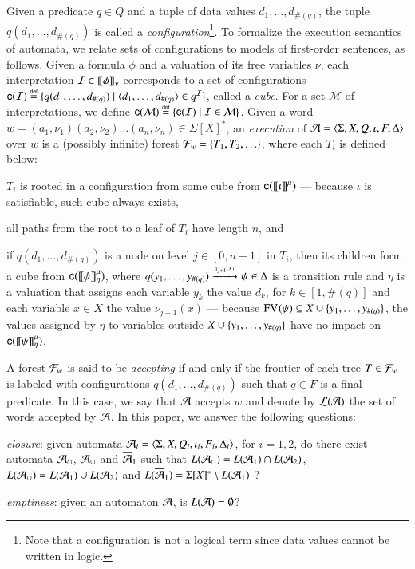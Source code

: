 \documentclass{llncs}
\begin{document}
Given a predicate $q \in Q$ and a tuple of data values
$d_1,\ldots,d_{\#(q)}$, the tuple $q(d_1,\ldots,d_{\#(q)})$ is called
a \emph{configuration}\footnote{Note that a configuration is not a
  logical term since data values cannot be written in logic.}. To
formalize the execution semantics of automata, we relate sets of
configurations to models of first-order sentences, as follows. Given a
formula $\phi$ and a valuation of its free variables $\nu$, each
interpretation $\mathcal{I} \in {\bf [\![} \phi {\bf ]\!]}_\nu$ corresponds to a set of
configurations $\mathsf{c}({\mathcal{I}}) \stackrel{\scriptscriptstyle{\mathsf{def}}}{=} \{ q(d_1,\ldots,d_{\#(q)}) \mid
  \langle d_1,\ldots,d_{\#(q)} \rangle \in q^{\mathcal{I}} \}$, called a \emph{cube}. For a
set $\mathcal{M}$ of interpretations, we define $\mathsf{c}({\mathcal{M}})
\stackrel{\scriptscriptstyle{\mathsf{def}}}{=} \{ \mathsf{c}({\mathcal{I}}) \mid \mathcal{I} \in \mathcal{M} \}$. Given a word
$w=(a_1,\nu_1)(a_2,\nu_2) \ldots (a_n,\nu_n) \in \Sigma[X]^*$, an
\emph{execution} of $\mathcal{A}=\langle \Sigma,X,Q,\iota,F,\Delta \rangle$ over $w$ is
a (possibly infinite) forest $\mathcal{F}_w = \{ T_1,T_2,\ldots \}$, where each
$T_i$ is defined below:
\begin{compactitem}
\item $T_i$ is rooted in a configuration from some cube from
  $\mathsf{c}({{\bf [\![} \iota {\bf ]\!]}^\mu})$ --- because $\iota$ is satisfiable, such cube
  always exists,
%
\item all paths from the root to a leaf of $T_i$ have length $n$, and
%
\item if $q(d_1,\ldots,d_{\#(q)})$ is a node on level $j \in [0,n-1]$
  in $T_i$, then its children form a cube from
  $\mathsf{c}({{\bf [\![} \psi {\bf ]\!]}^\mu_\eta})$, where \(q(y_1,\ldots,y_{\#(q)})
  \xrightarrow{{\scriptscriptstyle a_{j+1}(X)}}_{{\scriptstyle }} \psi \in \Delta\) is a transition rule and
  $\eta$ is a valuation that assigns each variable $y_k$ the value
  $d_k$, for $k \in [1,\#(q)]$ and each variable $x \in X$ the value
  $\nu_{j+1}(x)$ --- because $\mathrm{FV}_{}(\psi) \subseteq X \cup
  \{ y_1,\ldots,y_{\#(q)} \}$, the values assigned by $\eta$ to
  variables outside $X \cup \{ y_1,\ldots,y_{\#(q)} \}$ have no impact
  on $\mathsf{c}({{\bf [\![} \psi {\bf ]\!]}^\mu_\eta})$.
\end{compactitem}
A forest $\mathcal{F}_w$ is said to be \emph{accepting} if and only if the
frontier of each tree $T \in \mathcal{F}_w$ is labeled with configurations
$q(d_1,\ldots,d_{\#(q)})$ such that $q \in F$ is a final predicate. In
this case, we say that $\mathcal{A}$ accepts $w$ and denote by ${\mathcal L}({\mathcal{A}})$ the
set of words accepted by $\mathcal{A}$. In this paper, we answer the following
questions: \begin{compactenum}
\item \emph{closure}: given automata $\mathcal{A}_i =
  \langle \Sigma,X,Q_i,\iota_i,F_i,\Delta_i \rangle$, for $i=1,2$, do there
  exist automata $\mathcal{A}_\cap$, $\mathcal{A}_\cup$ and $\overline{\mathcal{A}}_1$ such that
  $L(\mathcal{A}_\cap) = L(\mathcal{A}_1) \cap L(\mathcal{A}_2)$, $L(\mathcal{A}_\cup) = L(\mathcal{A}_1) \cup
  L(\mathcal{A}_2)$ and $L(\overline{\mathcal{A}}_1) = \Sigma[X]^* \setminus L(\mathcal{A}_1)$ ?
%
\item \emph{emptiness}: given an automaton $\mathcal{A}$, is $L(\mathcal{A}) =
  \emptyset$?
\end{compactenum}
\end{document}
